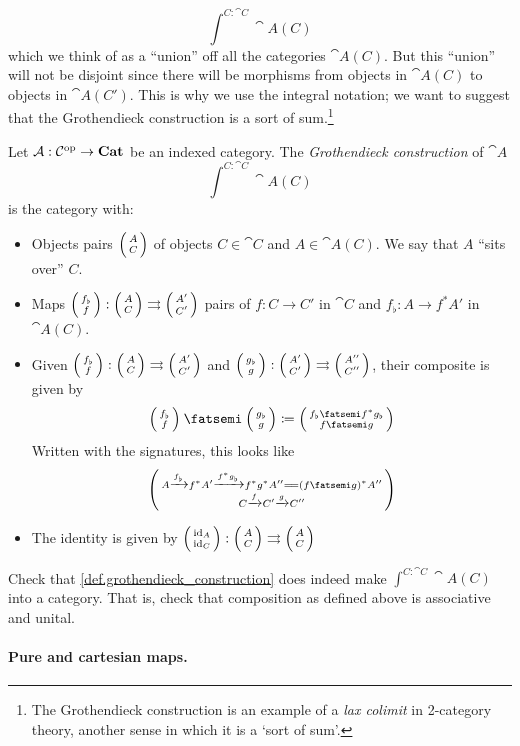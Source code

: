 \documentclass[DynamicalBook]{subfiles}
\begin{document}
$$\int^{C : \cat{C}} \cat{A}(C)$$
which we think of as a ``union'' off all the categories $\cat{A}(C)$. But this
``union'' will not be
disjoint since there will be morphisms from objects in $\cat{A}(C)$ to objects
in $\cat{A}(C')$. This is why we use the integral notation; we want to suggest
that the Grothendieck construction is a sort of sum.\footnote{The Grothendieck
  construction is an example of a \emph{lax colimit} in 2-category theory,
  another sense in which it is a `sort of sum'.}
\begin{definition}\label{def.grothendieck_construction}
  Let $\mathcal{A} : \mathcal{C}^{\textnormal{op}} \to \textbf{Cat}$ be an indexed category. The
  \emph{Grothendieck construction} of $\cat{A}$
  $$\int^{C : \cat{C}} \cat{A}(C)$$
  is the category with:
  \begin{itemize}
    \item Objects pairs $\lens{A}{C}$ of objects $C \in \cat{C}$ and $A \in
      \cat{A}(C)$. We say that $A$ ``sits over'' $C$.
    \item Maps $\lens{f_{\flat}}{f} : \lens{A}{C} \rightrightarrows
      \lens{A'}{C'}$ pairs of $f : C \to C'$ in $\cat{C}$ and $f_{\flat} :
      A \to f^{\ast}A'$ in $\cat{A}(C)$.
    \item Given $\lens{f_{\flat}}{f} : \lens{A}{C} \rightrightarrows
      \lens{A'}{C'}$ and $\lens{g_{\flat}}{g} : \lens{A'}{C'} \rightrightarrows
      \lens{A''}{C''}$, their composite is given by
      $$\lens{f_{\flat}}{f} \then \lens{g_{\flat}}{g} \coloneqq \lens{f_{\flat} \then f^{\ast}g_{\flat}
      }{f \then g}$$
    Written with the signatures, this looks like
    $$\lens{A \xto{f_{\flat}} f^{\ast}A' \xto{f^{\ast}g_{\flat}}
      f^{\ast}g^{\ast}A'' \xequals{\phantom{\gamma}} (f \then g)^\ast A''}{C \xto{f} C' \xto{g} C''}$$
    \item The identity is given by $\lens{\id_A}{\id_C} : \lens{A}{C}
      \rightrightarrows \lens{A}{C}$
  \end{itemize}
\end{definition}

\begin{exercise}
  Check that \cref{def.grothendieck_construction} does indeed make $\int^{C :
    \cat{C}} \cat{A}(C)$ into a category. That is, check that composition as
  defined above is associative and unital.
\end{exercise}

\paragraph{Pure and cartesian maps.}\label{sec.pure_and_cartesian_maps}
\end{document}
